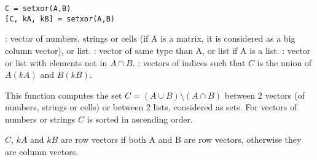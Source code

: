 
\begin{mandesc}
\end{mandesc}

\begin{calling_sequence}
\begin{verbatim}
C = setxor(A,B)
[C, kA, kB] = setxor(A,B)
\end{verbatim}
\end{calling_sequence}
\begin{parameters}
  \begin{varlist}
    : vector of numbers, strings or cells (if A is a matrix, it is
    considered as a big column vector), or list.
    : vector of same type than A, or list if A is a list. 
    : vector or list with elements not in  $A \cap B$.
    : vectors of indices such that $C$  is the union of
    $A(kA)$ and $B(kB)$.
  \end{varlist}
\end{parameters}

\begin{mandescription}
  This function computes the set $C = (A \cup B) \setminus (A \cap B)$
  between 2 vectors (of numbers, strings or cells) or between 2
  lists, considered as sets. For vectors of numbers or strings
  $C$ is sorted in ascending order.

  $C$, $kA$ and $kB$ are row vectors if both A and B are row vectors, otherwise they
  are column vectors.
  
\end{mandescription}

